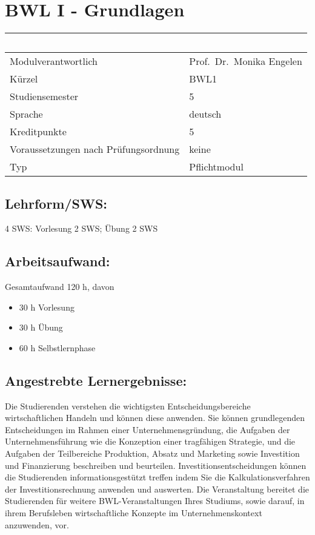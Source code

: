 \chapter{BWL I - Grundlagen}\label{bwl-i---grundlagen}

\begin{longtable}[]{@{}ll@{}}
\toprule
~ & ~\tabularnewline
\midrule
\endhead
Modulverantwortlich & Prof.~Dr.~Monika Engelen\tabularnewline
Kürzel & BWL1\tabularnewline
Studiensemester & 5\tabularnewline
Sprache & deutsch\tabularnewline
Kreditpunkte & 5\tabularnewline
Voraussetzungen nach Prüfungsordnung & keine\tabularnewline
Typ & Pflichtmodul\tabularnewline
\bottomrule
\end{longtable}

\section*{Lehrform/SWS:}\label{lehrformsws-6}

4 SWS: Vorlesung 2 SWS; Übung 2 SWS

\section*{Arbeitsaufwand:}\label{arbeitsaufwand-6}

Gesamtaufwand 120 h, davon

\begin{itemize}
\item
  30 h Vorlesung
\item
  30 h Übung
\item
  60 h Selbstlernphase
\end{itemize}

\section*{Angestrebte
Lernergebnisse:}\label{angestrebte-lernergebnisse-6}

Die Studierenden verstehen die wichtigsten Entscheidungsbereiche
wirtschaftlichen Handeln und können diese anwenden. Sie können
grundlegenden Entscheidungen im Rahmen einer Unternehmensgründung, die
Aufgaben der Unternehmensführung wie die Konzeption einer tragfähigen
Strategie, und die Aufgaben der Teilbereiche Produktion, Absatz und
Marketing sowie Investition und Finanzierung beschreiben und beurteilen.
Investitionsentscheidungen können die Studierenden informationsgestützt
treffen indem Sie die Kalkulationsverfahren der Investitionsrechnung
anwenden und auswerten. Die Veranstaltung bereitet die Studierenden für
weitere BWL-Veranstaltungen Ihres Studiums, sowie darauf, in ihrem
Berufsleben wirtschaftliche Konzepte im Unternehmenskontext anzuwenden,
vor.

